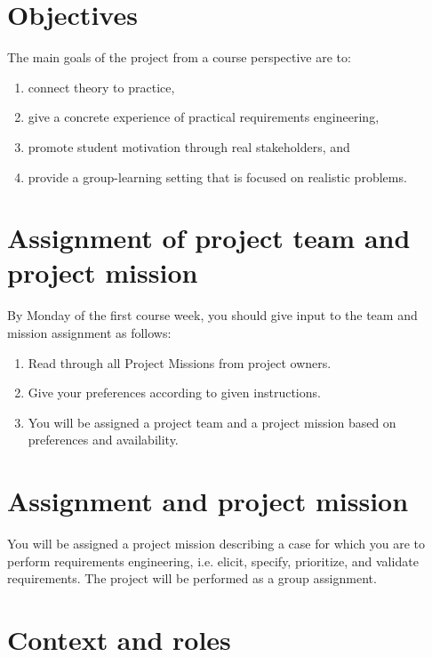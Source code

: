 
\maketitle
\vspace{-1cm}

\section{Objectives}
The main goals of the project from a course perspective are to:
\begin{enumerate}[nolistsep]
\item connect theory to practice,
\item give a concrete experience of practical requirements engineering,
\item promote student motivation through real stakeholders, and
\item provide a group-learning setting that is focused on realistic problems.
\end{enumerate}

\ifteknolog
   \section{Assignment of project team and project mission}
   By Monday of the first course week, you should give input to the team and mission
assignment as follows:
\begin{enumerate}[nolistsep]
   \item Read through all Project Missions from project owners.
   \item  Give your preferences according to given instructions.
   \item  You will be assigned a project team and a project mission based on preferences
   and availability.
\end{enumerate}
\else
   \section{Assignment and project mission}
   You will be assigned a project mission describing a case for which you are to perform requirements engineering, i.e. elicit, specify, prioritize, and validate requirements. The project will be performed as a group assignment.
\fi

\ifteknolog
   \section{Context and roles}

